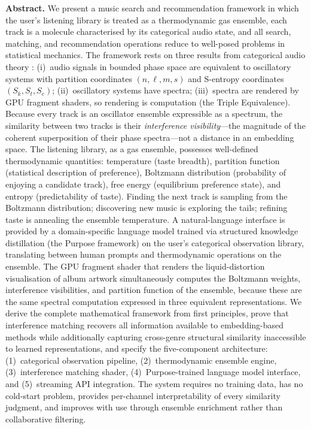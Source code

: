 \documentclass[11pt,twocolumn,a4paper]{article}
\newcommand{\Sk}{S_k}
\newcommand{\St}{S_t}
\newcommand{\Se}{S_e}
\begin{document}
\begin{@twocolumnfalse}
\begin{center}
\begin{minipage}{0.92\textwidth}
\textbf{Abstract.}
We present a music search and recommendation framework in which the
user's listening library is treated as a thermodynamic gas ensemble, each
track is a molecule characterised by its categorical audio state, and
all search, matching, and recommendation operations reduce to
well-posed problems in statistical mechanics. The framework rests on
three results from categorical audio theory
\citep{sachikonye2026categorical}: (i)~audio signals in bounded phase
space are equivalent to oscillatory systems with partition coordinates
$(n, \ell, m, s)$ and S-entropy coordinates $(\Sk, \St, \Se)$;
(ii)~oscillatory systems have spectra; (iii)~spectra are rendered by
GPU fragment shaders, so rendering is computation (the Triple
Equivalence). Because every track is an oscillator ensemble expressible
as a spectrum, the similarity between two tracks is their
\emph{interference visibility}---the magnitude of the coherent
superposition of their phase spectra---not a distance in an embedding
space. The listening library, as a gas ensemble, possesses
well-defined thermodynamic quantities: temperature (taste breadth),
partition function (statistical description of preference), Boltzmann
distribution (probability of enjoying a candidate track), free energy
(equilibrium preference state), and entropy (predictability of taste).
Finding the next track is sampling from the Boltzmann distribution;
discovering new music is exploring the tails; refining taste is
annealing the ensemble temperature. A natural-language interface is
provided by a domain-specific language model trained via structured
knowledge distillation (the Purpose framework) on the user's
categorical observation library, translating between human prompts and
thermodynamic operations on the ensemble. The GPU fragment shader that
renders the liquid-distortion visualisation of album artwork
simultaneously computes the Boltzmann weights, interference
visibilities, and partition function of the ensemble, because these are
the same spectral computation expressed in three equivalent
representations. We derive the complete mathematical framework from
first principles, prove that interference matching recovers all
information available to embedding-based methods while additionally
capturing cross-genre structural similarity inaccessible to learned
representations, and specify the five-component architecture: (1)~categorical
observation pipeline, (2)~thermodynamic ensemble engine,
(3)~interference matching shader, (4)~Purpose-trained language model
interface, and (5)~streaming API integration. The system requires no
training data, has no cold-start problem, provides per-channel
interpretability of every similarity judgment, and improves with use
through ensemble enrichment rather than collaborative filtering.


\end{minipage}
\end{center}
\end{@twocolumnfalse}
\end{document}
